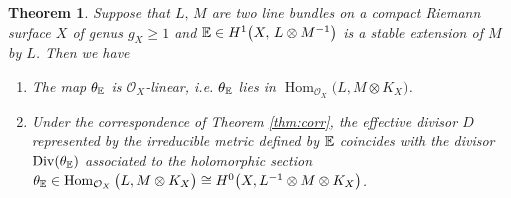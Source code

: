 \documentclass[12pt]{article}
\newtheorem{thm}{Theorem}[section]
\begin{document}
\begin{thm}
\label{thm:rami}
Suppose that $L, \, M$ are two line bundles on a compact Riemann surface $X$ of genus $g_{X} \geq 1$ and
${\Bbb E}\in H^1\big(X,\, L\otimes M^{-1}\big)$ is a stable extension of $M$ by $L$. Then we have
\begin{enumerate}
\item The map $\theta_{\Bbb E}$ is $\mathcal{O}_{X}$-linear, i.e. $\theta_{\Bbb E}$ lies in $\operatorname{Hom}_{\mathcal{O}_{X}} \big(L, M \otimes K_{X}\big) $.
\item Under the correspondence of Theorem \ref{thm:corr}, the effective divisor $D$ represented by the irreducible metric defined by ${\Bbb E}$ coincides with the divisor $\operatorname{Div} (\theta_{\Bbb E})$ associated to the holomorphic section
    $\theta_{\Bbb E}\in \operatorname{Hom}_{\mathcal{O}_{X}} \big(L, M \otimes K_{X}\big)\cong H^{0}\big(X, L^{-1} \otimes M \otimes K_{X}\big)$.
\end{enumerate}
\end{thm}
\end{document}
